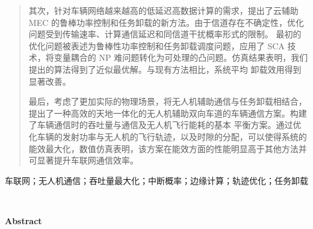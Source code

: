 \begin{abstract}
其次，针对车辆网络越来越高的低延迟高数据计算的需求，提出了云辅助 MEC 的鲁棒功率控制和任务卸载的新方法。由于信道存在不确定性，优化问题受到传输速率、计算通信延迟和同信道干扰概率形式的限制。
最初的优化问题被表述为鲁棒性功率控制和任务卸载调度问题，应用了 SCA 技术，将变量耦合的 NP 难问题转化为可处理的凸问题。仿真结果表明，我们提出的算法得到了近似最优解。与现有方法相比，系统平均
卸载效用得到显著改善。

最后，考虑了更加实际的物理场景，将无人机辅助通信与任务卸载相结合，提出了一种高效的天地一体化的无人机辅助双向车道的车辆通信方案。构建了车辆通信时的吞吐量与通信及无人机飞行能耗的基本
平衡方案。通过优化车辆的发射功率与无人机的飞行轨迹，以及时隙的分配，可以使得系统的能效最大化，数值仿真表明，该方案在能效方面的性能明显高于其他方法并可显著提升车联网通信效率。
\end{abstract}

\begin{keywords}
车联网；无人机通信；吞吐量最大化；中断概率；边缘计算；轨迹优化；任务卸载
\end{keywords}


\newpage\ \vspace{-2.5em}
\begin{center}
\textbf{Abstract}
\end{center}

\makeatletter
  \pagestyle{fancy}%
  \fancyhf{}
\makeatother


